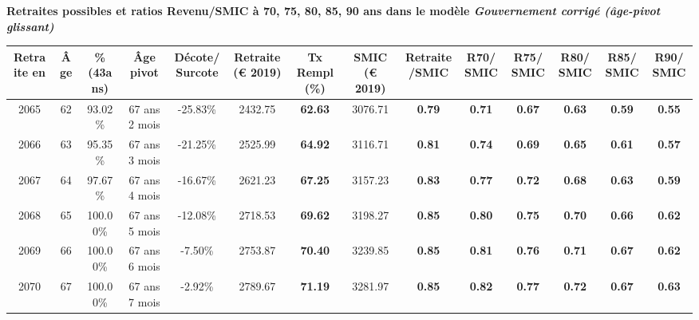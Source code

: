  \vspace{0.1cm} 
{\bf \noindent Retraites possibles et ratios Revenu/SMIC à 70, 75, 80, 85, 90 ans dans le modèle \emph{Gouvernement corrigé (âge-pivot glissant)}}  
 
\begin{adjustbox}{max width=\textwidth} 
\begin{tabular}[htb]{|c|c||c|c|c||c|c||c|c||c|c|c|c|c|} 
\hline 
 Retraite en &  Âge &  \%(43ans) &  Âge pivot &  Décote/Surcote &  Retraite (\euro{} 2019) &  Tx Rempl(\%) &  SMIC (\euro{} 2019) &  Retraite/SMIC &  R70/SMIC &  R75/SMIC &  R80/SMIC &  R85/SMIC &  R90/SMIC \\ 
\hline \hline 
 2065 &  62 &  93.02\% &  67 ans 2 mois &  -25.83\% &  2432.75 &  {\bf 62.63} &  3076.71 &  {\bf {\color{red} 0.79}} &  {\bf {\color{red} 0.71}} &  {\bf {\color{red} 0.67}} &  {\bf {\color{red} 0.63}} &  {\bf {\color{red} 0.59}} &  {\bf {\color{red} 0.55}} \\ 
\hline 
 2066 &  63 &  95.35\% &  67 ans 3 mois &  -21.25\% &  2525.99 &  {\bf 64.92} &  3116.71 &  {\bf {\color{red} 0.81}} &  {\bf {\color{red} 0.74}} &  {\bf {\color{red} 0.69}} &  {\bf {\color{red} 0.65}} &  {\bf {\color{red} 0.61}} &  {\bf {\color{red} 0.57}} \\ 
\hline 
 2067 &  64 &  97.67\% &  67 ans 4 mois &  -16.67\% &  2621.23 &  {\bf 67.25} &  3157.23 &  {\bf {\color{red} 0.83}} &  {\bf {\color{red} 0.77}} &  {\bf {\color{red} 0.72}} &  {\bf {\color{red} 0.68}} &  {\bf {\color{red} 0.63}} &  {\bf {\color{red} 0.59}} \\ 
\hline 
 2068 &  65 &  100.00\% &  67 ans 5 mois &  -12.08\% &  2718.53 &  {\bf 69.62} &  3198.27 &  {\bf {\color{red} 0.85}} &  {\bf {\color{red} 0.80}} &  {\bf {\color{red} 0.75}} &  {\bf {\color{red} 0.70}} &  {\bf {\color{red} 0.66}} &  {\bf {\color{red} 0.62}} \\ 
\hline 
 2069 &  66 &  100.00\% &  67 ans 6 mois &  -7.50\% &  2753.87 &  {\bf 70.40} &  3239.85 &  {\bf {\color{red} 0.85}} &  {\bf {\color{red} 0.81}} &  {\bf {\color{red} 0.76}} &  {\bf {\color{red} 0.71}} &  {\bf {\color{red} 0.67}} &  {\bf {\color{red} 0.62}} \\ 
\hline 
 2070 &  67 &  100.00\% &  67 ans 7 mois &  -2.92\% &  2789.67 &  {\bf 71.19} &  3281.97 &  {\bf {\color{red} 0.85}} &  {\bf {\color{red} 0.82}} &  {\bf {\color{red} 0.77}} &  {\bf {\color{red} 0.72}} &  {\bf {\color{red} 0.67}} &  {\bf {\color{red} 0.63}} \\ 
\hline 
\hline 
\end{tabular} 
\end{adjustbox} 
 
